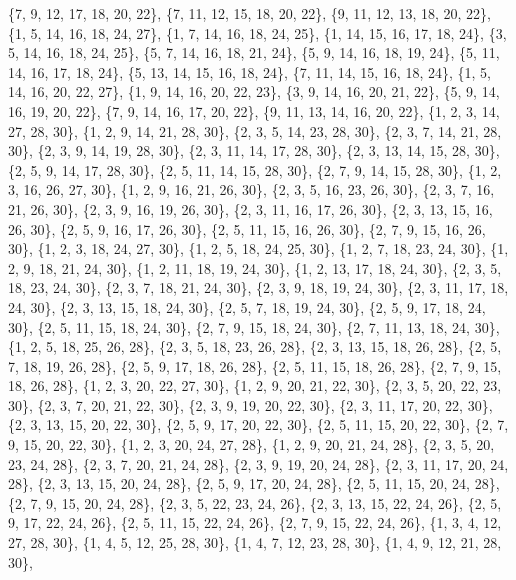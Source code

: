 \documentclass[11pt,a4paper]{article}
\begin{document}
{\{7, 9, 12, 17, 18, 20, 22\}, \{7, 11, 12, 15, 18, 20, 22\}, \{9, 11, 12, 13, 18, 20, 22\}, \{1, 5, 14, 16, 18, 24, 27\}, \{1, 7, 14, 16, 18, 24, 25\},
\{1, 14, 15, 16, 17, 18, 24\}, \{3, 5, 14, 16, 18, 24, 25\}, \{5, 7, 14, 16, 18, 21, 24\}, \{5, 9, 14, 16, 18, 19, 24\}, \{5, 11, 14, 16, 17, 18, 24\},
\{5, 13, 14, 15, 16, 18, 24\}, \{7, 11, 14, 15, 16, 18, 24\}, \{1, 5, 14, 16, 20, 22, 27\}, \{1, 9, 14, 16, 20, 22, 23\}, \{3, 9, 14, 16, 20, 21, 22\},
\{5, 9, 14, 16, 19, 20, 22\}, \{7, 9, 14, 16, 17, 20, 22\}, \{9, 11, 13, 14, 16, 20, 22\}, \{1, 2, 3, 14, 27, 28, 30\}, \{1, 2, 9, 14, 21, 28, 30\},
\{2, 3, 5, 14, 23, 28, 30\}, \{2, 3, 7, 14, 21, 28, 30\}, \{2, 3, 9, 14, 19, 28, 30\}, \{2, 3, 11, 14, 17, 28, 30\}, \{2, 3, 13, 14, 15, 28, 30\},
\{2, 5, 9, 14, 17, 28, 30\}, \{2, 5, 11, 14, 15, 28, 30\}, \{2, 7, 9, 14, 15, 28, 30\}, \{1, 2, 3, 16, 26, 27, 30\}, \{1, 2, 9, 16, 21, 26, 30\},
\{2, 3, 5, 16, 23, 26, 30\}, \{2, 3, 7, 16, 21, 26, 30\}, \{2, 3, 9, 16, 19, 26, 30\}, \{2, 3, 11, 16, 17, 26, 30\}, \{2, 3, 13, 15, 16, 26, 30\},
\{2, 5, 9, 16, 17, 26, 30\}, \{2, 5, 11, 15, 16, 26, 30\}, \{2, 7, 9, 15, 16, 26, 30\}, \{1, 2, 3, 18, 24, 27, 30\}, \{1, 2, 5, 18, 24, 25, 30\},
\{1, 2, 7, 18, 23, 24, 30\}, \{1, 2, 9, 18, 21, 24, 30\}, \{1, 2, 11, 18, 19, 24, 30\}, \{1, 2, 13, 17, 18, 24, 30\}, \{2, 3, 5, 18, 23, 24, 30\},
\{2, 3, 7, 18, 21, 24, 30\}, \{2, 3, 9, 18, 19, 24, 30\}, \{2, 3, 11, 17, 18, 24, 30\}, \{2, 3, 13, 15, 18, 24, 30\}, \{2, 5, 7, 18, 19, 24, 30\},
\{2, 5, 9, 17, 18, 24, 30\}, \{2, 5, 11, 15, 18, 24, 30\}, \{2, 7, 9, 15, 18, 24, 30\}, \{2, 7, 11, 13, 18, 24, 30\}, \{1, 2, 5, 18, 25, 26, 28\},
\{2, 3, 5, 18, 23, 26, 28\}, \{2, 3, 13, 15, 18, 26, 28\}, \{2, 5, 7, 18, 19, 26, 28\}, \{2, 5, 9, 17, 18, 26, 28\}, \{2, 5, 11, 15, 18, 26, 28\},
\{2, 7, 9, 15, 18, 26, 28\}, \{1, 2, 3, 20, 22, 27, 30\}, \{1, 2, 9, 20, 21, 22, 30\}, \{2, 3, 5, 20, 22, 23, 30\}, \{2, 3, 7, 20, 21, 22, 30\},
\{2, 3, 9, 19, 20, 22, 30\}, \{2, 3, 11, 17, 20, 22, 30\}, \{2, 3, 13, 15, 20, 22, 30\}, \{2, 5, 9, 17, 20, 22, 30\}, \{2, 5, 11, 15, 20, 22, 30\},
\{2, 7, 9, 15, 20, 22, 30\}, \{1, 2, 3, 20, 24, 27, 28\}, \{1, 2, 9, 20, 21, 24, 28\}, \{2, 3, 5, 20, 23, 24, 28\}, \{2, 3, 7, 20, 21, 24, 28\},
\{2, 3, 9, 19, 20, 24, 28\}, \{2, 3, 11, 17, 20, 24, 28\}, \{2, 3, 13, 15, 20, 24, 28\}, \{2, 5, 9, 17, 20, 24, 28\}, \{2, 5, 11, 15, 20, 24, 28\},
\{2, 7, 9, 15, 20, 24, 28\}, \{2, 3, 5, 22, 23, 24, 26\}, \{2, 3, 13, 15, 22, 24, 26\}, \{2, 5, 9, 17, 22, 24, 26\}, \{2, 5, 11, 15, 22, 24, 26\},
\{2, 7, 9, 15, 22, 24, 26\}, \{1, 3, 4, 12, 27, 28, 30\}, \{1, 4, 5, 12, 25, 28, 30\}, \{1, 4, 7, 12, 23, 28, 30\}, \{1, 4, 9, 12, 21, 28, 30\},
}
\end{document}
